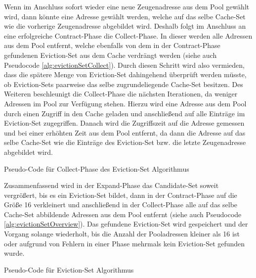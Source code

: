 Wenn im Anschluss sofort wieder eine neue Zeugenadresse aus dem Pool gewählt wird, dann könnte eine Adresse gewählt werden, welche auf das selbe Cache-Set wie die vorherige Zeugenadresse abgebildet wird.
Deshalb folgt im Anschluss an eine erfolgreiche Contract-Phase die Collect-Phase.
In dieser werden alle Adressen aus dem Pool entfernt, welche ebenfalls von dem in der Contract-Phase gefundenen Eviction-Set aus dem Cache verdrängt werden (siehe auch Pseudocode \ref{alg:evictionSetCollect}).
Durch diesen Schritt wird also vermieden, dass die spätere Menge von Eviction-Set dahingehend überprüft werden müsste, ob Eviction-Sets paarweise das selbe zugrundeliegende Cache-Set besitzen. 
Des Weiteren beschleunigt die Collect-Phase die nächsten Iterationen, da weniger Adressen im Pool zur Verfügung stehen.
Hierzu wird eine Adresse aus dem Pool durch einen Zugriff in den Cache geladen und anschließend auf alle Einträge im Eviction-Set zugegriffen.
Danach wird die Zugriffszeit auf die Adresse gemessen und bei einer erhöhten Zeit aus dem Pool entfernt, da dann die Adresse auf das selbe Cache-Set wie die Einträge des Eviction-Set bzw. die letzte Zeugenadresse abgebildet wird.

\begin{algorithm}[h]
\DontPrintSemicolon
\caption{Pseudo-Code für Collect-Phase des Eviction-Set Algorithmus}
\label{alg:evictionSetCollect}

\end{algorithm}

Zusammenfassend wird in der Expand-Phase das Candidate-Set soweit vergrößert, bis es ein Eviction-Set bildet, dann in der Contract-Phase auf die Größe 16 verkleinert und anschließend in der Collect-Phase alle auf das selbe Cache-Set abbildende Adressen aus dem Pool entfernt (siehe auch Pseudocode \ref{alg:evictionSetOverview}).
Das gefundene Eviction-Set wird gespeichert und der Vorgang solange wiederholt, bis die Anzahl der Pooladressen kleiner als 16 ist oder aufgrund von Fehlern in einer Phase mehrmals kein Eviction-Set gefunden wurde.

\begin{algorithm}[h]
\DontPrintSemicolon
\caption{Pseudo-Code für Eviction-Set Algorithmus}
\label{alg:evictionSetOverview}

\end{algorithm}

